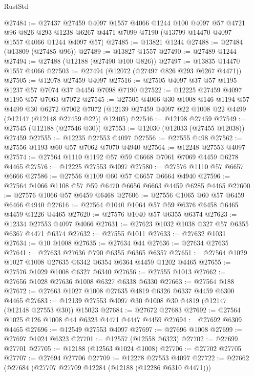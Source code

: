 \begin{lexlean}{RustStd}
\begin{coremodule}
@27484 := @27437
    @27459
    @4097
    @1557
    @4066
    @1244
    @100
    @4097
    @57
    @4721
    @96
    @826
    @293
    @1238
    @6267
    @4471
    @7099
    @7190
    (@13799 @14470 @4097 @1557 @4066 @1244 @4097 @57)
@27485 := @13821 @1244
@27488 := @27484 (@13809 (@27485 @96))
@27489 := @13827 @1557
@27490 := @27489 @1244
@27494 := @27488 (@12188 (@27490 @100 @826))
@27497 := @13835 @14470 @1557 @4066
@27503 := @27494 (@12072 (@27497 @826 @293 @6267 @4471))
@27505 := @12078 @27459 @4097
@27516 := @27505 @4097 @37 @57 @1195 @1237 @57 @7074 @37 @4456 @7098 @7190
@27522 := @12225 @27459 @4097 @1195 @57 @7063 @7072
@27545 := @27505
    @4066
    @30
    @1008
    @146
    @1194
    @57
    @4499
    @30
    @6272
    @7062
    @7072
    (@12139 @27459 @4097 @22 @1008 @22 @4499 (@12147 (@12148 @27459 @22)) @12405)
@27546 := @12198 @27459
@27549 := @27545 (@12188 (@27546 @30))
@27553 := @12030 (@12033 (@27455 @12038)) @27459
@27555 := @12235 @27553 @4097
@27556 := @27555 @498
@27562 := @27556 @1193 @60 @57 @7062 @7070 @4940
@27564 := @12248 @27553 @4097
@27574 := @27564 @1110 @1192 @57 @59 @6668 @7061 @7069 @4459 @6278 @4465
@27576 := @12225 @27553 @4097
@27580 := @27576 @1110 @57 @6657 @6666
@27586 := @27556 @1109 @60 @57 @6657 @6664 @4940
@27596 := @27564 @1066 @1108 @57 @59 @6470 @6656 @6663 @4459 @6285 @4465
@27600 := @27576 @1066 @57 @6459 @6468
@27606 := @27556 @1065 @60 @57 @6459 @6466 @4940
@27616 := @27564 @1040 @1064 @57 @59 @6376 @6458 @6465 @4459 @1226 @4465
@27620 := @27576 @1040 @57 @6355 @6374
@27623 := @12334 @27553 @4097 @4066
@27631 := @27623 @1032 @1038 @327 @57 @6355 @6367 @4471 @6374
@27632 := @27555 @1011
@27633 := @27632 @1031
@27634 := @10 @1008
@27635 := @27634 @44
@27636 := @27634 @27635
@27641 := @27633 @27636 @790 @6355 @6365 @6357
@27651 := @27564 @1029 @1027 @1008 @27635 @6342 @6354 @6364 @4459 @1202 @4465
@27655 := @27576 @1029 @1008 @6327 @6340
@27656 := @27555 @1013
@27662 := @27656 @1028 @27636 @1008 @6327 @6338 @6330
@27663 := @27564 @188
@27672 := @27663 @1027 @1008 @27635 @4819 @6326 @6337 @4459 @6300 @4465
@27683 := @12139 @27553 @4097 @30 @1008 @30 @4819 (@12147 (@12148 @27553 @30)) @15023
@27684 := @27672 @27683
@27692 := @27564 @1025 @126 @1008 @44 @6323 @4471 @4447 @4459
@27694 := @27692 @6309 @4465
@27696 := @12549 @27553 @4097
@27697 := @27696 @1008
@27699 := @27697 @1024 @6323
@27701 := @12557 (@12558 @6323)
@27702 := @27699 @27701
@27705 := @12188 (@12563 @1024 @1008)
@27706 := @27702 @27705
@27707 := @27694 @27706
@27709 := @12278 @27553 @4097
@27722 := @27662
    (@27684
      (@27707 @27709 @12284 (@12188 (@12286 @6310 @4471)))

\end{coremodule}
\end{lexlean}
